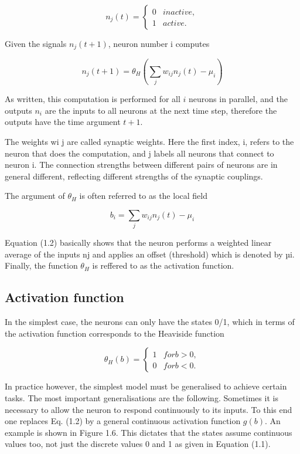 $$ 
n_j(t) = 
	\begin{cases}	
		0 & inactive,\\
		1 & active.
	\end{cases} 
$$

Given the signals $ n_j(t+1) $, neuron number i computes

$$  
n_j(t+1)=\theta_H \left(\sum\limits_{j}w_{ij}n_j(t) - \mu_i \right)
$$

As written, this computation is performed for all $ i $ neurons in parallel, and the outputs $ n_i $ are the inputs to all neurons at the next time step, therefore the outputs have the time argument $ t+1 $.

The weights wi j are called synaptic weights. Here the first index, i,
refers to the neuron that does the computation, and j labels all neurons that connect
to neuron i. The connection strengths between different pairs of neurons are in
general different, reflecting different strengths of the synaptic couplings.

The argument of $ \theta_H $ is often referred to as the local field

$$ b_i = \sum\limits_{j}w_{ij}n_j(t) - \mu_i $$

Equation (1.2) basically shows that the neuron performs a weighted linear average of the inputs nj and applies an offset (threshold) which is denoted by µi. Finally, the function $ \theta_H $ is reffered to as the activation function.

\subsection{Activation function}

In the simplest case, the neurons can only have the states 0/1, which in terms of the activation function corresponds to the Heaviside function

$$ 
\theta_H(b) = 
\begin{cases}	
1 & for b > 0,\\
0 & for b < 0.
\end{cases} 
$$

In practice however, the simplest model must be generalised to achieve certain tasks. The most important
generalisations are the following. Sometimes it is necessary to allow the neuron to respond continuously to its inputs. To this end one replaces Eq. (1.2) by a general continuous activation function $ g(b) $. An example is shown in Figure 1.6. This dictates that the states assume continuous values too, not just the discrete
values 0 and 1 as given in Equation (1.1).